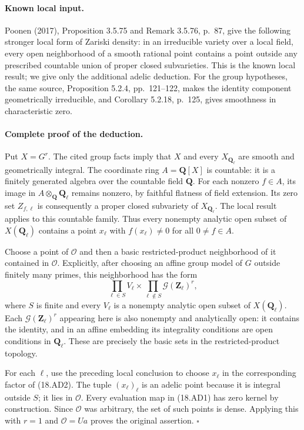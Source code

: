 \paragraph{Known local input.}
Poonen (2017), Proposition 3.5.75 and Remark 3.5.76, p.~87,
give the following stronger local form of Zariski density: in an
irreducible variety over a local field, every open neighborhood of
a smooth rational point contains a point outside any prescribed
countable union of proper closed subvarieties.  This is the known
local result; we give only the additional adelic deduction.
For the group hypotheses, the same source, Proposition 5.2.4,
pp.~121--122, makes the identity component geometrically
irreducible, and Corollary 5.2.18, p.~125, gives smoothness in
characteristic zero.

\paragraph{Complete proof of the deduction.}
Put \(X=G^r\).  The cited group facts imply that \(X\) and every
\(X_{\mathbf Q_\ell}\) are smooth and geometrically integral.
The coordinate ring \(A=\mathbf Q[X]\) is countable: it is a
finitely generated algebra over the countable field \(\mathbf Q\).
For each nonzero \(f\in A\), its image in
\(A\otimes_{\mathbf Q}\mathbf Q_\ell\) remains nonzero, by
faithful flatness of field extension.  Its zero set
\(Z_{f,\ell}\) is consequently a proper closed subvariety of
\(X_{\mathbf Q_\ell}\).  The local result applies to this
countable family.  Thus every nonempty analytic open subset of
\(X(\mathbf Q_\ell)\) contains a point \(x_\ell\) with
\(f(x_\ell)\ne0\) for all \(0\ne f\in A\).

Choose a point of \(\mathcal O\) and then a basic restricted-product
neighborhood of it contained in \(\mathcal O\).  Explicitly, after
choosing an affine group model of \(G\) outside finitely many
primes, this neighborhood has the form
\[
       \prod_{\ell\in S}V_\ell
          \times\prod_{\ell\notin S}\mathcal G(\mathbf Z_\ell)^r,
 \tag{18.AD2}
\]
where \(S\) is finite and every \(V_\ell\) is a nonempty
analytic open subset of \(X(\mathbf Q_\ell)\).
Each \(\mathcal G(\mathbf Z_\ell)^r\) appearing here is also
nonempty and analytically open: it contains the identity, and in
an affine embedding its integrality conditions are open conditions
in \(\mathbf Q_\ell\).  These are precisely the basic sets in
the restricted-product topology.

For each \(\ell\), use the preceding local conclusion to choose
\(x_\ell\) in the corresponding factor of (18.AD2).  The tuple
\((x_\ell)_\ell\) is an adelic point because it is integral
outside \(S\); it lies in \(\mathcal O\).  Every evaluation map
in (18.AD1) has zero kernel by construction.  Since
\(\mathcal O\) was arbitrary, the set of such points is dense.
Applying this with \(r=1\) and \(\mathcal O=Ua\) proves the
original assertion. \(\square\)

